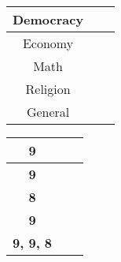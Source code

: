 \documentclass{book}
\begin{document}


\begin{tabular}{ccc}
    \hline
Democracy\\
\hline
Economy\\
\hline
Math\\
\hline
Religion\\
\hline
General\\
\hline
\end{tabular}
\quad
\begin{tabular}{ccc}
\hline
    \textbf{9}\\
\hline
    \textbf{9}\\
\hline
    \textbf{8}\\
\hline
    \textbf{9}\\
\hline
    \textbf{9, 9, 8}\\
\hline
\end{tabular}
\end{document}
